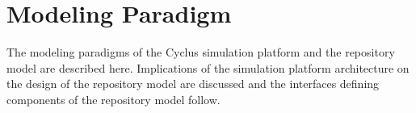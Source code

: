 \chapter{Modeling Paradigm}\label{ch:paradigm}

The modeling paradigms of the Cyclus simulation platform and the \Cyder 
repository model are described here. Implications of the 
simulation platform architecture on the design of the repository model 
are discussed and the interfaces defining components of the repository 
model follow. 




